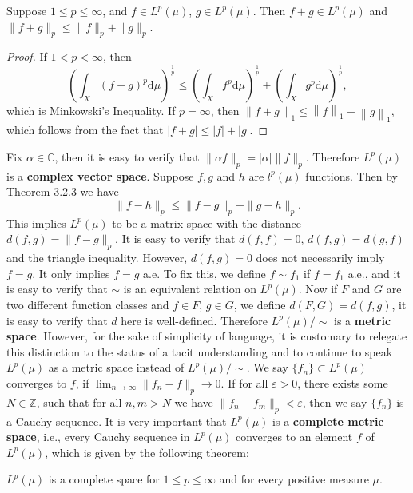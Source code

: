 \begin{theorem}
Suppose $1\le p\le\infty$, and $f\in L^p(\mu)$, $g\in L^p(\mu)$. Then $f+g\in L^p(\mu)$ and $\|f+g\|_p\le\|f\|_p+\|g\|_p$.
\end{theorem}
\begin{proof}
If $1<p<\infty$, then 
$$
\left( \int_X{\left( f+g \right) ^p\mathrm{d}\mu} \right) ^{\frac{1}{p}}\le \left( \int_X{f^p\mathrm{d}\mu} \right) ^{\frac{1}{p}}+\left( \int_X{g^p\mathrm{d}\mu} \right) ^{\frac{1}{p}},
$$
which is Minkowski's Inequality. If $p=\infty$, then $\left\| f+g \right\| _1\le \left\| f \right\| _1+\left\| g \right\| _1$, which follows from the fact that $\left| f+g \right|\le \left| f \right|+\left| g \right|$.
\end{proof}
Fix $\alpha\in\mathbb{C}$, then it is easy to verify that $\|\alpha f\|_p=|\alpha|\|f\|_p$. Therefore $L^p(\mu)$ is a \textbf{complex vector space}. Suppose $f,g$ and $h$ are $l^p(\mu)$ functions. Then by Theorem 3.2.3 we have 
$$\|f-h\|_p\le\|f-g\|_p+\|g-h\|_p.$$
This implies $L^p(\mu)$ to be a matrix space with the distance $d(f,g)=\|f-g\|_p$. It is easy to verify that $d(f,f)=0$, $d(f,g)=d(g,f)$ and the triangle inequality. However, $d(f,g)=0$ does not necessarily imply $f=g$. It only implies $f=g$ a.e. To fix this, we define $f\sim f_1$ if $f=f_1$ a.e., and it is easy to verify that $\sim$ is an equivalent relation on $L^p(\mu)$. Now if $F$ and $G$ are two different function classes and $f\in F$, $g\in G$, we define $d(F,G)=d(f,g)$, it is easy to verify that $d$ here is well-defined. Therefore $L^p(\mu)/\sim$ is a \textbf{metric space}. However, for the sake of simplicity of language, it is customary to relegate this distinction to the status of a tacit understanding and to continue to speak $L^p(\mu)$ as a metric space instead of $L^p(\mu)/\sim$. We say $\{f_n\}\subset L^p(\mu)$ converges to $f$, if $\lim_{n\to\infty}\|f_n-f\|_p\to 0$. If for all $\varepsilon>0$, there exists some $N\in\mathbb{Z}$, such that for all $n,m>N$ we have $\|f_n-f_m\|_p<\varepsilon$, then we say $\{f_n\}$ is a Cauchy sequence. It is very important that $L^p(\mu)$ is a \textbf{complete metric space}, i.e., every Cauchy sequence in $L^p(\mu)$ converges to an element $f$ of $L^p(\mu)$, which is given by the following theorem:
\begin{theorem}
$L^p(\mu)$ is a complete space for $1\le p\le\infty$ and for every positive measure $\mu$.
\end{theorem}

